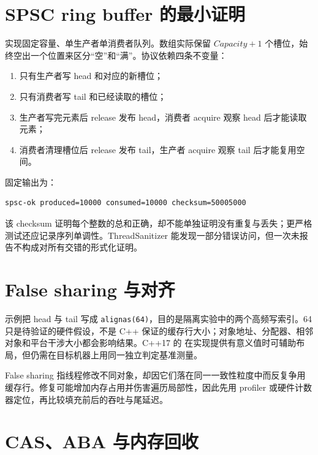 \section{SPSC ring buffer 的最小证明}

 实现固定容量、单生产者单消费者队列。数组实际保留 \(Capacity+1\) 个槽位，始终空出一个位置来区分“空”和“满”。协议依赖四条不变量：

\begin{enumerate}
  \item 只有生产者写 head 和对应的新槽位；
  \item 只有消费者写 tail 和已经读取的槽位；
  \item 生产者写完元素后 release 发布 head，消费者 acquire 观察 head 后才能读取元素；
  \item 消费者清理槽位后 release 发布 tail，生产者 acquire 观察 tail 后才能复用空间。
\end{enumerate}



固定输出为：

\begin{lstlisting}[numbers=none]
spsc-ok produced=10000 consumed=10000 checksum=50005000
\end{lstlisting}

该 checksum 证明每个整数的总和正确，却不能单独证明没有重复与丢失；更严格测试还应记录序列单调性。ThreadSanitizer 能发现一部分错误访问，但一次未报告不构成对所有交错的形式化证明。

\section{False sharing 与对齐}

示例把 head 与 tail 写成 \texttt{alignas(64)}，目的是隔离实验中的两个高频写索引。64 只是待验证的硬件假设，不是 C++ 保证的缓存行大小；对象地址、分配器、相邻对象和平台干涉大小都会影响结果。C++17 的  在实现提供有意义值时可辅助布局，但仍需在目标机器上用同一独立判定基准测量。

False sharing 指线程修改不同对象，却因它们落在同一一致性粒度中而反复争用缓存行。修复可能增加内存占用并伤害遍历局部性，因此先用 profiler 或硬件计数器定位，再比较填充前后的吞吐与尾延迟。

\section{CAS、ABA 与内存回收}

